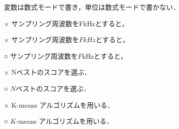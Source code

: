 変数は数式モードで書き，単位は数式モードで書かない．

× サンプリング周波数をFkHzとすると，

× サンプリング周波数を$FkHz$とすると，

○ サンプリング周波数を$F$kHzとすると，


× Nベストのスコアを選ぶ．

○ $N$ベストのスコアを選ぶ．


× K-means アルゴリズムを用いる．

○ $K$-means アルゴリズムを用いる．